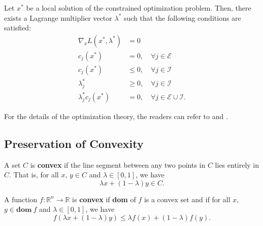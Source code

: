 \begin{theorem}
  Let $x^*$ be a local solution of the constrained optimization problem. 
  Then, there exists a Lagrange multiplier vector $\lambda^*$ such that the following conditions are satisfied:
  \begin{equation}
    \begin{aligned}
      \nabla_x L(x^*,\lambda^*) &= 0\\
      c_j(x^*) &= 0, \quad \forall j\in\mathcal E\\
      c_j(x^*) &\leq 0, \quad \forall j\in\mathcal I\\
      \lambda_j^* &\geq 0, \quad \forall j\in\mathcal I\\
      \lambda_j^*c_j(x^*) &= 0, \quad \forall j\in\mathcal E\cup\mathcal I
      .
    \end{aligned}
  \end{equation}
  \label{chap2:thm:KKT}
\end{theorem}
For the details of the optimization theory, the readers can refer to \cite{RN9} and \cite{RN1}.

\subsection{Preservation of Convexity} 

\begin{definition}
  A set $C$ is \textbf{convex} if the line segment between any two points in $C$ lies entirely in $C$. That is, for all $x$, $y\in C$ and $\lambda\in [0,1]$, we have
  \begin{equation}
      \lambda x + (1-\lambda)y \in C
      .
  \end{equation}
\end{definition}

\begin{definition}
  A function $f:\mathbb R^n\to \mathbb R$ is \textbf{convex} if \textbf{dom} of $f$ is a convex set and if for all $x$, $y\in \textbf{dom}\ f$ and $\lambda\in [0,1]$, we have
  \begin{equation}
      f(\lambda x + (1-\lambda)y) \leq \lambda f(x) + (1-\lambda)f(y)
      .
  \end{equation}
\end{definition}

